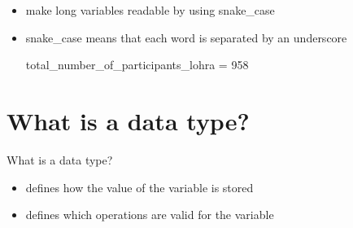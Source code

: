 \documentclass[
  american,
  ignorenonframetext,
]{beamer}
\begin{document}
\begin{frame}{}
\protect\hypertarget{section}{}

\begin{itemize}
\item
  make long variables readable by using snake\_case
\item
  snake\_case means that each word is separated by an underscore
  \vspace{1em}

  \begin{pythoncode}

  total_number_of_participants_lohra = 958

  \end{pythoncode}
\end{itemize}

\end{frame}

\hypertarget{what-is-a-data-type}{%
\section{What is a data type?}\label{what-is-a-data-type}}

\begin{frame}{What is a data type?}
\protect\hypertarget{what-is-a-data-type-1}{}

\begin{itemize}
\item
  defines how the value of the variable is stored
\item
  defines which operations are valid for the variable
\end{itemize}


\end{frame}
\end{document}
